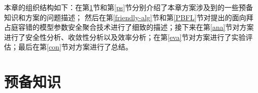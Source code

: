 本章的组织结构如下：在第\ref{bg}节和第\ref{ps}节分别介绍了本章方案涉及到的一些预备知识和方案的问题描述；
然后在第\ref{friendly-alg}节和第\ref{PBFL}节对提出的面向拜占庭容错的模型参数安全聚合技术进行了细致的描述；接下来在第\ref{ana}节对方案进行了安全性分析、收敛性分析以及效率分析；在第\ref{eva}节对方案进行了实验评估；最后在第\ref{con}节对方案进行了总结。
\section{预备知识}\label{bg}

%

